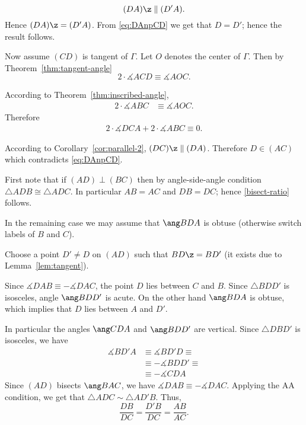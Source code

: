 {$$(DA)\z\parallel(D'A).$$
Hence $(DA)\z=(D'A)$. 
From \ref{eq:DAnpCD} we get that $D=D'$;
hence the result follows.

 Now assume $(CD)$ is tangent of $\Gamma$.
Let $O$ denotes the center of $\Gamma$.
Then
by Theorem~\ref{thm:tangent-angle}
$$2\cdot\measuredangle ACD\equiv \measuredangle AOC.$$


According to Theorem~\ref{thm:inscribed-angle},
\begin{align*}
2\cdot\measuredangle ABC&\equiv\measuredangle AOC.
\end{align*}
Therefore
\begin{align*}
2\cdot\measuredangle DCA+2\cdot\measuredangle ABC\equiv0.
\end{align*}

According to Corollary~\ref{cor:parallel-2}, $(DC)\z\parallel(DA)$. 
Therefore $D\in (AC)$ which contradicts \ref{eq:DAnpCD}.
















First note that if $(AD)\perp(BC)$ then by angle-side-angle condition $\triangle A D B\cong\triangle ADC$.
In particular $AB=AC$ and $DB=DC$; hence \ref{bisect-ratio} follows.

In the remaining case we may assume that $\ang B D A$ is obtuse (otherwise switch labels of $B$ and $C$).

Choose a point $D'\not=D$ on $(AD)$ such that $B D\z=B D'$ (it exists due to Lemma~\ref{lem:tangent}).

Since $\measuredangle DAB\equiv-\measuredangle DAC$,
the point
$D$ lies between $C$ and $B$.
Since $\triangle BDD'$ is isosceles,
angle $\ang BDD'$ is acute.
On the other hand $\ang B D A$ is obtuse, 
which implies that $D$ lies between $A$ and $D'$.

In particular the angles $\ang C D A$ and $\ang B D D'$ are vertical.
Since $\triangle D B D'$ is isosceles, we have 
\begin{align*}
\measuredangle B D' A&\equiv \measuredangle B D' D\equiv
\\
&\equiv -\measuredangle B D D'\equiv
\\
&\equiv -\measuredangle C D A
\end{align*}
Since $(AD)$ bisects $\ang B A C$, we have $\measuredangle DAB\equiv -\measuredangle D A C$.
Applying the AA condition, we get that $\triangle ADC\sim \triangle A D' B$.
Thus,
$$\frac{DB}{DC}=\frac{D' B}{DC}=\frac{AB}{AC}.$$
\qedsf









}
